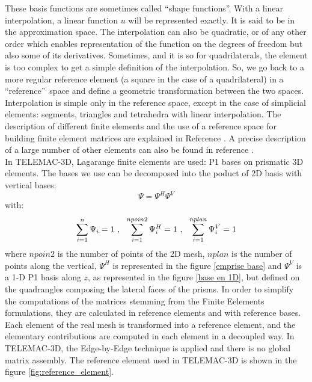 These basis functions are sometimes called \textquotedblleft shape
functions\textquotedblright. With a linear interpolation, a linear function
$u$ will be represented exactly. It is said to be in the approximation space.
The interpolation can also be quadratic, or of any other order which enables
representation of the function on the degrees of freedom but also some of its derivatives.
Sometimes, and it is so for quadrilaterals, the element is too complex to get
a simple definition of the interpolation. So, we go back to a more regular
reference element (a square in the case of a quadrilateral) in a
\textquotedblleft reference\textquotedblright\ space and define a geometric
transformation between the two spaces. Interpolation is simple only in the
reference space, except in the case of simplicial elements: segments,
triangles and tetrahedra with linear interpolation. The description of
different finite elements and the use of a reference space for building finite
element matrices are explained in Reference \cite{hervouet007}. A precise
description of a large number of other elements can also be found in reference
\cite{dhatt81}.\\

In TELEMAC-3D, Lagarange finite elements are used: P1 bases on prismatic
3D elements. The bases we use can be decomposed into the poduct of
2D basis with vertical bases:
\begin{equation}
\Psi=\Psi^H\Psi^V
\end{equation}
with:
\begin{equation}
\displaystyle\sum_{i=1}^{n}\Psi_i=1~,~~\displaystyle\sum_{i=1}^{npoin2}\Psi_i^H=1~,~~\displaystyle\sum_{i=1}^{nplan}\Psi_i^V=1
\end{equation}
where $npoin2$ is the number of points of the 2D mesh, $nplan$ is the number of
points along the vertical, $\Psi^H$ is represented in the figure \ref{emprise base} and $\Psi^V$ is
a 1-D P1 basis along $z$, as represented in the figure \ref{base en 1D}, but defined on the quadrangles composing the lateral faces of the prisms.
In order to simplify the computations of the matrices stemming from the Finite Eelements formulations, 
they are calculated in reference elements and with reference bases. 
Each element of the real mesh is transformed into a reference element, and the elementary
contributions are computed in each element in a decoupled way. In TELEMAC-3D, the
Edge-by-Edge technique is applied and there is no global matrix assembly. 
The reference element used in TELEMAC-3D is shown in the figure \ref{fig:reference_element}. 

